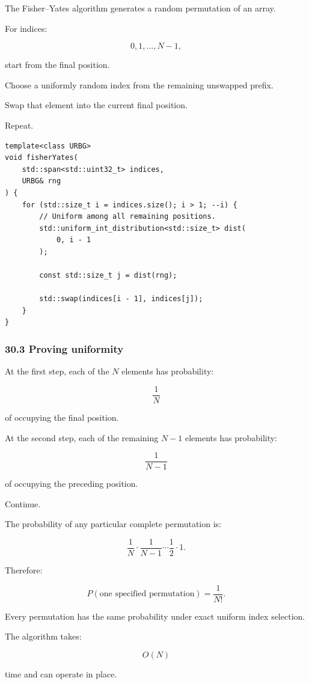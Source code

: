 The Fisher--Yates algorithm generates a random permutation of an array.

For indices:

\[ 0,1,\ldots,N-1, \]

start from the final position.

Choose a uniformly random index from the remaining unswapped prefix.

Swap that element into the current final position.

Repeat.

\begin{verbatim}
template<class URBG>
void fisherYates(
    std::span<std::uint32_t> indices,
    URBG& rng
) {
    for (std::size_t i = indices.size(); i > 1; --i) {
        // Uniform among all remaining positions.
        std::uniform_int_distribution<std::size_t> dist(
            0, i - 1
        );

        const std::size_t j = dist(rng);

        std::swap(indices[i - 1], indices[j]);
    }
}
\end{verbatim}

\subsubsection{30.3 Proving uniformity}\label{proving-uniformity}

At the first step, each of the \(N\) elements has probability:

\[ \frac1N \]

of occupying the final position.

At the second step, each of the remaining \(N-1\) elements has probability:

\[ \frac1{N-1} \]

of occupying the preceding position.

Continue.

The probability of any particular complete permutation is:

\[ \frac1N \cdot \frac1{N-1} \cdots \frac12 \cdot1. \]

Therefore:

\[ \boxed{ P(\text{one specified permutation})=\frac1{N!} }. \]

Every permutation has the same probability under exact uniform index selection.

The algorithm takes:

\[ \boxed{O(N)} \]

time and can operate in place.

